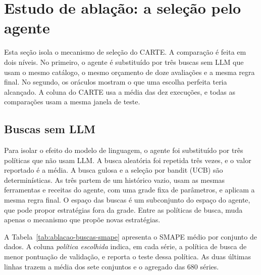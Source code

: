 \section{Estudo de ablação: a seleção pelo agente} \label{sec:ablacao-agente}

Esta seção isola o mecanismo de seleção do CARTE. A comparação é feita em dois níveis. No primeiro, o agente é substituído por três buscas sem LLM que usam o mesmo catálogo, o mesmo orçamento de doze avaliações e a mesma regra final. No segundo, os oráculos mostram o que uma escolha perfeita teria alcançado. A coluna do CARTE usa a média das dez execuções, e todas as comparações usam a mesma janela de teste.

\subsection{Buscas sem LLM} \label{subsec:buscas-sem-llm}

Para isolar o efeito do modelo de linguagem, o agente foi substituído por três políticas que não usam LLM. A busca aleatória foi repetida três vezes, e o valor reportado é a média. A busca gulosa e a seleção por bandit (UCB) são determinísticas. As três partem de um histórico vazio, usam as mesmas ferramentas e receitas do agente, com uma grade fixa de parâmetros, e aplicam a mesma regra final. O espaço das buscas é um subconjunto do espaço do agente, que pode propor estratégias fora da grade. Entre as políticas de busca, muda apenas o mecanismo que propõe novas estratégias.

A Tabela~\ref{tab:ablacao-buscas-smape} apresenta o SMAPE médio por conjunto de dados. A coluna \textit{política escolhida} indica, em cada série, a política de busca de menor pontuação de validação, e reporta o teste dessa política. As duas últimas linhas trazem a média dos sete conjuntos e o agregado das 680 séries.

